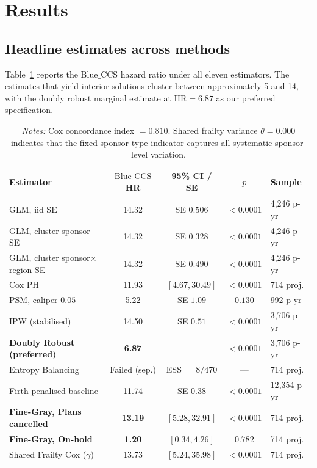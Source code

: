 \documentclass[review,authoryear,11pt]{elsarticle}
\newcommand{\HR}{\mathrm{HR}}
\newcommand{\BlueCCS}{\mathrm{Blue\_CCS}}
\begin{document}
\section{Results}

\subsection{Headline estimates across methods}

Table~\ref{tab:headline} reports the $\BlueCCS$ hazard ratio under all eleven estimators. The estimates that yield interior solutions cluster between approximately 5 and 14, with the doubly robust marginal estimate at $\HR = 6.87$ as our preferred specification.

\begin{table}[H]
\centering
\caption{$\BlueCCS$ hazard ratio across eleven estimators.}
\label{tab:headline}
\small
\begin{tabular}{lcccl}
\toprule
\textbf{Estimator} & \textbf{$\BlueCCS$ HR} & \textbf{95\% CI / SE} & \textbf{$p$} & \textbf{Sample} \\
\midrule
GLM, iid SE & 14.32 & SE $0.506$ & $<0.0001$ & 4{,}246 p-yr \\
GLM, cluster sponsor SE & 14.32 & SE $0.328$ & $<0.0001$ & 4{,}246 p-yr \\
GLM, cluster sponsor$\times$region SE & 14.32 & SE $0.490$ & $<0.0001$ & 4{,}246 p-yr \\
Cox PH & 11.93 & $[4.67, 30.49]$ & $<0.0001$ & 714 proj. \\
PSM, caliper $0.05$ & 5.22 & SE $1.09$ & $0.130$ & 992 p-yr \\
IPW (stabilised) & 14.50 & SE $0.51$ & $<0.0001$ & 3{,}706 p-yr \\
\textbf{Doubly Robust (preferred)} & \textbf{6.87} & --- & $<0.0001$ & 3{,}706 p-yr \\
Entropy Balancing & Failed (sep.) & ESS $= 8/470$ & --- & 714 proj. \\
Firth penalised baseline & 11.74 & SE $0.38$ & $<0.0001$ & 12{,}354 p-yr \\
\textbf{Fine-Gray, Plans cancelled} & \textbf{13.19} & $[5.28, 32.91]$ & $<0.0001$ & 714 proj. \\
\textbf{Fine-Gray, On-hold} & \textbf{1.20} & $[0.34, 4.26]$ & $0.782$ & 714 proj. \\
Shared Frailty Cox ($\gamma$) & 13.73 & $[5.24, 35.98]$ & $<0.0001$ & 714 proj. \\
\bottomrule
\end{tabular}
\caption*{\footnotesize \textit{Notes:} Cox concordance index $= 0.810$. Shared frailty variance $\theta = 0.000$ indicates that the fixed sponsor type indicator captures all systematic sponsor-level variation.}
\end{table}
\end{document}
